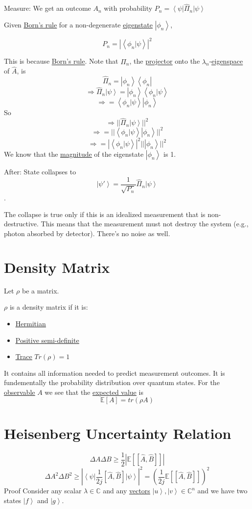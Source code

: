 \documentclass[
]{article}
\providecommand{\tightlist}{%
  \setlength{\itemsep}{0pt}\setlength{\parskip}{0pt}}
\let\oldhyperref\hyperref
\renewcommand{\hyperref}[2][]{\oldhyperref[#1]{\underline{#2}}}
\providecommand{\ket}[1]{\left\lvert #1 \right\rangle}
\providecommand{\bra}[1]{\left\langle #1 \right\rvert}
\providecommand{\braket}[1]{\left\langle #1 \right\rangle}
\providecommand{\Rarr}{\Rightarrow}
\begin{document}
Measure: We get an outcome \(A_n\) with probability \(P_n=\bra{\psi}\hat{\Pi}_n\ket{\psi}\)

Given \hyperref[borns-rule]{Born's rule} for a non-degenerate \hyperref[eigenstates]{eigenstate} \(\ket{\phi_n}\),

\[
	P_n=|\braket{\phi_n|\psi}|^2
\]


This is because \hyperref[borns-rule]{Born's rule}.
Note that \(\hat{\Pi}_n\), the \hyperref[projectors]{projector} onto the \(\lambda_n\)-\hyperref[eigenspaces]{eigenspace} of \(\hat{A}\), is
\[
	\hat{\Pi}_n=\ket{\phi_n}\bra{\phi_n}
\]
\[
	\Rarr \hat{\Pi}_n\ket{\psi}=\ket{\phi_n}\braket{\phi_n|\psi}
\]
\[
	\Rarr =\braket{\phi_n|\psi}\ket{\phi_n}
\]
So
\[
	\Rarr ||\hat{\Pi}_n\ket{\psi}||^2
\]
\[
	\Rarr = ||\braket{\phi_n|\psi}\ket{\phi_n}||^2
\]
\[
	\Rarr = |\braket{\phi_n|\psi}|^2||\ket{\phi_n}||^2
\]
We know that the \hyperref[magnitude]{magnitude} of the eigenstate \(\ket{\phi_n}\) is 1.

After: State collapses to
\[
	\ket{\psi'}=\frac{1}{\sqrt{P_n}}\hat{\Pi}_n\ket{\psi}
\].

The collapse is true only if this is an idealized measurement that is non-destructive.
This means that the measurement must not destroy the system (e.g., photon absorbed by detector). There's no noise as well.

\section{Density Matrix}\label{density-matrix}

Let \(\rho\) be a matrix.

\(\rho\) is a density matrix if it is:

\begin{itemize}
	\tightlist
	\item \hyperref[hermitian-matrix]{Hermitian}
	\item \hyperref[positive-semi-definite-psd-operators]{Positive semi-definite}
	\item \hyperref[traces]{Trace} \(Tr(\rho)=1\)
\end{itemize}

It contains all information needed to predict measurement outcomes.
It is fundementally the probability distribution over quantum states.
For the \hyperref[observables]{observable} \(A\) we see that the \hyperref[expected-value-of-observables]{expected value} is
\[
	\mathbb{E}[A]=tr(\rho A)
\]


\section{Heisenberg Uncertainty Relation}\label{uncertainty-relation}
\[
	\Delta A\Delta B\geq \frac{1}{2}\left|\mathbb{E}\left[[\hat{A},\hat{B}]\right]\right|
\]
\[
	\Delta A^2 \Delta B^2 \geq \left|\bra{\psi}\frac{1}{2j}[\hat{A},\hat{B}]\ket{\psi}\right|^2 = \left(\frac{1}{2j}\mathbb{E}\left[[\hat{A},\hat{B}]\right]\right)^2
\]
Proof
Consider any scalar \(\lambda\in \mathbb{C}\) and any \hyperref[vectors]{vectors} \(\ket{u},\ket{v}\in \mathbb{C}^n\) and we have two states \(\ket{f}\) and \(\ket{g}\).
\end{document}
